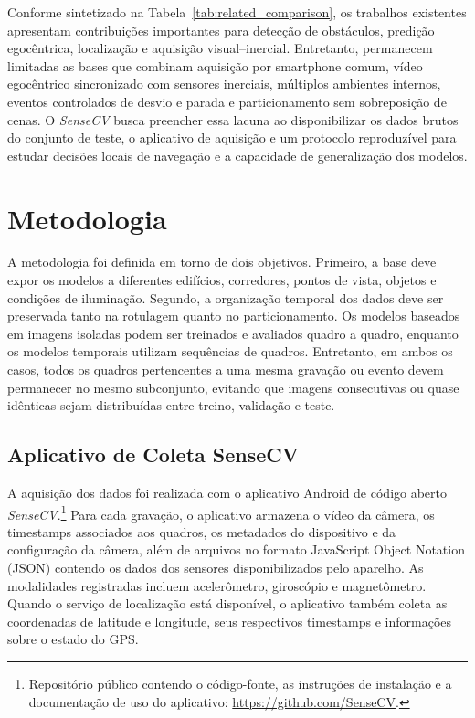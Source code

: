 \documentclass[conference]{IEEEtran}
\newcommand{\sensecv}{\textit{SenseCV}}
\begin{document}
Conforme sintetizado na Tabela~\ref{tab:related_comparison}, os trabalhos existentes apresentam contribuições importantes para detecção de obstáculos, predição egocêntrica, localização e aquisição visual--inercial. Entretanto, permanecem limitadas as bases que combinam aquisição por smartphone comum, vídeo egocêntrico sincronizado com sensores inerciais, múltiplos ambientes internos, eventos controlados de desvio e parada e particionamento sem sobreposição de cenas. O \sensecv{} busca preencher essa lacuna ao disponibilizar os dados brutos do conjunto de teste, o aplicativo de aquisição e um protocolo reproduzível para estudar decisões locais de navegação e a capacidade de generalização dos modelos.



\section{Metodologia}

A metodologia foi definida em torno de dois objetivos. Primeiro, a base deve expor os modelos a diferentes edifícios, corredores, pontos de vista, objetos e condições de iluminação. Segundo, a organização temporal dos dados deve ser preservada tanto na rotulagem quanto no particionamento. Os modelos baseados em imagens isoladas podem ser treinados e avaliados quadro a quadro, enquanto os modelos temporais utilizam sequências de quadros. Entretanto, em ambos os casos, todos os quadros pertencentes a uma mesma gravação ou evento devem permanecer no mesmo subconjunto, evitando que imagens consecutivas ou quase idênticas sejam distribuídas entre treino, validação e teste.

\subsection{Aplicativo de Coleta SenseCV}

A aquisição dos dados foi realizada com o aplicativo Android de código aberto \sensecv.\footnote{Repositório público contendo o código-fonte, as instruções de instalação e a documentação de uso do aplicativo: \url{https://github.com/SenseCV}.} Para cada gravação, o aplicativo armazena o vídeo da câmera, os timestamps associados aos quadros, os metadados do dispositivo e da configuração da câmera, além de arquivos no formato JavaScript Object Notation (JSON) contendo os dados dos sensores disponibilizados pelo aparelho. As modalidades registradas incluem acelerômetro, giroscópio e magnetômetro. Quando o serviço de localização está disponível, o aplicativo também coleta as coordenadas de latitude e longitude, seus respectivos timestamps e informações sobre o estado do GPS.
\end{document}
